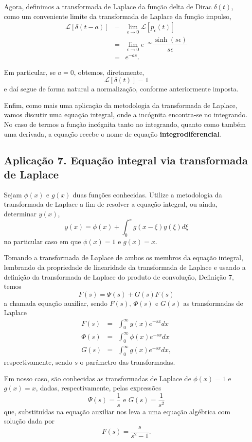 Agora, definimos a transformada de Laplace da função delta de Dirac $\delta(t)$, como um conveniente limite da transformada de Laplace da função impulso,
$$\begin{array}{rcl}
\mathscr{L}[\delta(t - a)]
&=& \displaystyle\lim_{\epsilon \to0} \mathscr{L}[p_{\epsilon} (t)] \\
&=& \displaystyle\lim_{\epsilon \to0} e^{-as} \dfrac{\sinh(s\epsilon)}{s\epsilon} \\
&=& e^{-as}.
\end{array}$$

Em particular, se $a = 0$, obtemos, diretamente,
$$\mathscr{L}[\delta(t)] = 1$$
e daí segue de forma natural a normalização, conforme anteriormente imposta.

Enfim, como mais uma aplicação da metodologia da transformada de Laplace, vamos discutir uma equação integral, onde a incógnita encontra-se no integrando. No caso de termos a função incógnita tanto no integrando, quanto como também uma derivada, a equação recebe o nome de equação \textbf{integrodiferencial}.

\subsection{Aplicação 7. Equação integral via transformada de Laplace}

Sejam $\phi(x)$ e $g(x)$ duas funções conhecidas. Utilize a metodologia da transformada de Laplace a fim de resolver a equação integral, ou ainda, determinar $y(x)$,
$$
y(x) = \phi(x) +
\int_{0}^{x} g(x - \xi) y(\xi) d\xi
$$
no particular caso em que $\phi(x) = 1$ e $g(x) = x$.

Tomando a transformada de Laplace de ambos os membros da equação integral, lembrando da propriedade de linearidade da transformada de Laplace e usando a definição da transformada de Laplace do produto de convolução, Definição 7, temos
$$F(s) = \Psi(s) + G(s) F(s)$$
a chamada equação auxiliar, sendo $F(s)$, $\Phi(s)$ e $G(s)$ as transformadas de Laplace
$$\begin{array}{rcl}
F(s) &=& \displaystyle\int_{0}^{\infty} y(x) e^{-sx} dx \\
\Phi(s) &=& \displaystyle\int_{0}^{\infty} \phi(x) e^{-sx} dx \\
G(s) &=& \displaystyle\int_{0}^{\infty} g(x) e^{-sx} dx,
\end{array}$$
respectivamente, sendo $s$ o parâmetro das transformadas.

Em nosso caso, são conhecidas as transformadas de Laplace de $\phi(x) = 1$ e $g(x) = x$, dadas, respectivamente, pelas expressões
$$\Psi(s) = \dfrac{1}{s}
\mbox{ e }
G(s) = \dfrac{1}{s^{2}}$$
que, substituídas na equação auxiliar nos leva a uma equação algébrica com solução dada por
$$F(s) =
\dfrac{s}{s^{2} - 1}.$$

